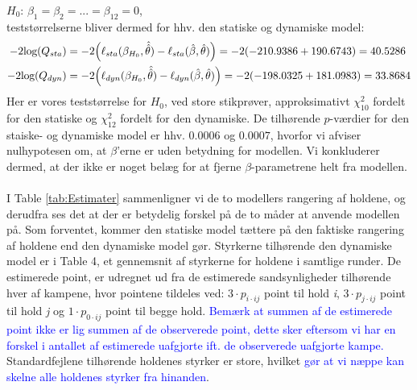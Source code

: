 \documentclass[11pt,a4paper]{article}
\begin{document}
$H_0$: $\beta_1=\beta_2=...=\beta_{12} = 0$,\\
teststørrelserne bliver dermed for hhv. den statiske og dynamiske model:\\
\begin{align*}
    -2\text{log}(Q_{sta})&=-2\Big{(}\ell_{sta} (\beta_{H_0}, \hat{\hat{\theta}})-\ell_{sta} (\hat{\beta},\hat{\theta})\Big{)}=-2(-210.9386+190.6743)=40.5286\\
    -2\text{log}(Q_{dyn})&=-2\Big{(}\ell_{dyn} (\beta_{H_0},\hat{\hat{\theta}})-\ell_{dyn} (\hat{\beta},\hat{\theta})\Big{)}=-2(-198.0325+181.0983)=33.8684
\end{align*}
Her er vores teststørrelse for $H_0$, ved store stikprøver, approksimativt $\chi^2_{10}$ fordelt for den statiske og $\chi^2_{12}$ fordelt for den dynamiske. De tilhørende $p$-værdier for den staiske- og dynamiske model er hhv. $0.0006$ og $0.0007$, hvorfor vi afviser nulhypotesen om, at $\beta$'erne er uden betydning for modellen. Vi konkluderer dermed, at der ikke er noget belæg for at fjerne $\beta$-parametrene helt fra modellen. 
\\\\I Table \ref{tab:Estimater} sammenligner vi de to modellers rangering af holdene, og derudfra ses det at der er betydelig forskel på de to måder at anvende modellen på.  Som forventet, kommer den statiske model tættere på den faktiske rangering af holdene end den dynamiske model gør. Styrkerne tilhørende den dynamiske model er i Table 4, et gennemsnit af styrkerne for holdene i samtlige runder. De estimerede point, er udregnet ud fra de estimerede sandsynligheder tilhørende hver af kampene, hvor pointene tildeles ved: $3 \cdot p_{i \cdot ij}$ point til hold \textit{i}, $3\cdot p_{j \cdot ij}$ point til hold \textit{j} og $1\cdot p_{0 \cdot ij}$ point til begge hold. \textcolor{blue}{Bemærk at summen af de estimerede point ikke er lig summen af de observerede point, dette sker eftersom vi har en forskel i antallet af estimerede uafgjorte ift. de observerede uafgjorte kampe.} Standardfejlene tilhørende holdenes styrker er store, hvilket \textcolor{blue}{gør at vi næppe kan skelne alle holdenes styrker fra hinanden}.\\
\end{document}

